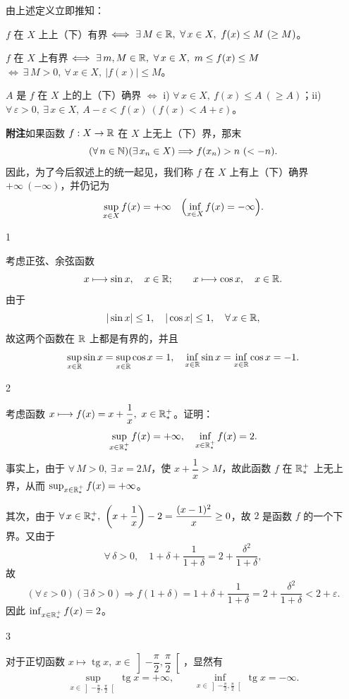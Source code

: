 由上述定义立即推知：

\(f\) 在 \(X\) 上上（下）有界 \(\Longleftrightarrow\ \exists\,M\in\R,\ \forall\,x\in X,\ f(x)\le M\ (\ge M)\)。

\(f\) 在 \(X\) 上有界 \(\Longleftrightarrow\ \exists\,m,M\in\R,\ \forall\,x\in X,\ m\le f(x)\le M\) \(\Longleftrightarrow\ \exists\,M>0,\ \forall\,x\in X,\ |f(x)|\le M\)。

\(A\) 是 \(f\) 在 \(X\) 上的上（下）确界 \(\Longleftrightarrow\) i) \(\forall\,x\in X,\ f(x)\le A\ (\ge A)\)；ii) \(\forall\,\varepsilon>0,\ \exists\,x\in X,\ A-\varepsilon<f(x)\ (f(x)<A+\varepsilon)\)。

\textbf{附注}\quad 如果函数 \(f:X\to\mathbb{R}\) 在 \(X\) 上无上（下）界，那末
\[
(\forall\,n\in\mathbb{N})(\exists\,x_n\in X)\Longrightarrow f(x_n)>n\ (<-n).
\]
因此，为了今后叙述上的统一起见，我们称 \(f\) 在 \(X\) 上有上（下）确界 \(+\infty\ (-\infty)\)，并仍记为
\[
\sup_{x\in X}f(x)=+\infty\quad \Bigl(\inf_{x\in X}f(x)=-\infty\Bigr).
\]

\begin{sourceexample}{1}

	考虑正弦、余弦函数
	\[
	x\longmapsto\sin x,\quad x\in\mathbb{R};\qquad x\longmapsto\cos x,\quad x\in\mathbb{R}.
	\]
	由于
	\[
	|\sin x|\le1,\quad |\cos x|\le1,\quad \forall\,x\in\mathbb{R},
	\]
	故这两个函数在 \(\mathbb{R}\) 上都是有界的，并且
	\[
	\sup_{x\in\mathbb{R}}\sin x=\sup_{x\in\mathbb{R}}\cos x=1,\quad \inf_{x\in\mathbb{R}}\sin x=\inf_{x\in\mathbb{R}}\cos x=-1.
	\]

\end{sourceexample}

\begin{sourceexample}{2}

	考虑函数 \(x\longmapsto f(x)=x+\dfrac1x,\ x\in\R^+_*\)。证明：
	\[
	\sup_{x\in\mathbb{R}^+_*}f(x)=+\infty,\quad \inf_{x\in\mathbb{R}^+_*}f(x)=2.
	\]
	事实上，由于 \(\forall\,M>0,\ \exists\,x=2M\)，使 \(x+\dfrac1x>M\)，故此函数 \(f\) 在 \(\mathbb{R}^+_*\) 上无上界，从而 \(\sup_{x\in\mathbb{R}^+_*}f(x)=+\infty\)。

	其次，由于 \(\forall\,x\in\R^+_*,\ \left(x+\dfrac1x\right)-2=\dfrac{(x-1)^2}{x}\ge0\)，故 \(2\) 是函数 \(f\) 的一个下界。又由于
	\[
	\forall\,\delta>0,\quad 1+\delta+\frac1{1+\delta}=2+\frac{\delta^2}{1+\delta},
	\]
	故
	\[
	(\forall\,\varepsilon>0)(\exists\,\delta>0)\Longrightarrow f(1+\delta)=1+\delta+\frac1{1+\delta}=2+\frac{\delta^2}{1+\delta}<2+\varepsilon.
	\]
	因此 \(\inf_{x\in\mathbb{R}^+_*}f(x)=2\)。

\end{sourceexample}

\begin{sourceexample}{3}

	对于正切函数 \(x\longmapsto\operatorname{tg}x,\ x\in\left]-\dfrac\pi2,\dfrac\pi2\right[\)，显然有
	\[
	\sup_{x\in\left]-\frac\pi2,\frac\pi2\right[}\operatorname{tg}x=+\infty,\qquad \inf_{x\in\left]-\frac\pi2,\frac\pi2\right[}\operatorname{tg}x=-\infty.
	\]

\end{sourceexample}

